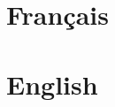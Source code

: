 \documentclass[a4paper, 14px, fleqn]{article}
\begin{document}
    
    \clearpage
    
    \tableofcontents
    \clearpage
    
    \section{Français}
    
    \clearpage

    \section{English}
    
    \clearpage
\end{document}

